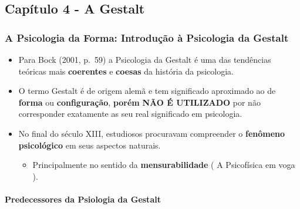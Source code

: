 \documentclass[
]{book}
\providecommand{\tightlist}{%
  \setlength{\itemsep}{0pt}\setlength{\parskip}{0pt}}
\begin{document}
\hypertarget{capuxedtulo-4---a-gestalt}{%
\subsection{Capítulo 4 - A Gestalt}\label{capuxedtulo-4---a-gestalt}}

\hypertarget{a-psicologia-da-forma-introduuxe7uxe3o-uxe0-psicologia-da-gestalt}{%
\subsubsection{A Psicologia da Forma: Introdução à Psicologia da
Gestalt}\label{a-psicologia-da-forma-introduuxe7uxe3o-uxe0-psicologia-da-gestalt}}

\begin{itemize}
\tightlist
\item
  Para Bock (2001, p.~59) a Psicologia da Gestalt é uma das tendências
  teóricas mais \textbf{coerentes} e \textbf{coesas} da história da
  psicologia.
\item
  O termo Gestalt é de origem alemã e tem significado aproximado ao de
  \textbf{forma} ou \textbf{configuração}, \textbf{porém} \textbf{NÃO É
  UTILIZADO} por não corresponder exatamente as seu real significado em
  psicologia.
\item
  No final do século XIII, estudiosos procuravam compreender o
  \textbf{fenômeno psicológico} em seus aspectos naturais.

  \begin{itemize}
  \tightlist
  \item
    Principalmente no sentido da \textbf{mensurabilidade} ( A
    Psicofísica em voga ).
  \end{itemize}
\end{itemize}

\hypertarget{predecessores-da-psiologia-da-gestalt}{%
\paragraph{Predecessores da Psiologia da
Gestalt}\label{predecessores-da-psiologia-da-gestalt}}
\end{document}
